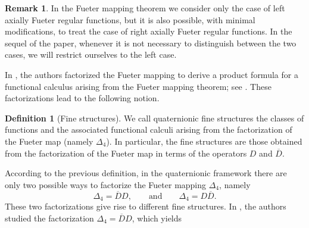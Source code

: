 \documentclass[reqno,11pt]{amsart}
\numberwithin{equation}{section}
\theoremstyle{definition}
\newtheorem{remark}[theorem]{{\bf Remark}}
\newtheorem{definition}[theorem]{Definition}
\begin{document}


\begin{remark}
	In the Fueter mapping theorem we consider only the case of left axially Fueter regular functions, but it is also possible, with minimal modifications, to treat the case of right axially Fueter regular functions. In the sequel of the paper, whenever it is not necessary to distinguish between the two cases, we will restrict ourselves to the left case.
\end{remark}

In \cite{CDPS}, the authors factorized the Fueter mapping to derive a product formula for a functional calculus arising from the Fueter mapping theorem; see \cite{CSSO}. These factorizations lead to the following notion.

\begin{definition}[Fine structures]
We call quaternionic fine structures the classes of functions and the associated functional calculi arising from the factorization of the Fueter map (namely $\Delta_4$). In particular, the fine structures are those obtained from the factorization of the Fueter map in terms of the operators $D$ and $\overline{D}$.
\end{definition}

According to the previous definition, in the quaternionic framework there are only two possible ways to factorize the Fueter mapping $\Delta_4$, namely
$$
\Delta_4=\overline{D}D, \qquad \text{and} \qquad \Delta_4=D\overline{D}.
$$
These two factorizations give rise to different fine structures. In \cite{CDPS}, the authors studied the factorization $\Delta_4=\overline{D}D$, which yields
\end{document}
